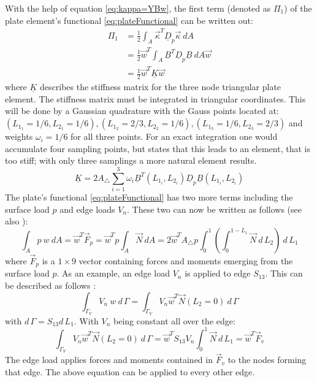   With the help of equation \ref{eq:kappa=YBw}, the first term (denoted as $\Pi_1$) of the plate element's functional \ref{eq:plateFunctional} can be written out:
  \begin{align}\label{eq:t3_pi1=0.5wTKw}
  \Pi_1 &= \frac{1}{2} \int_A \vec{\kappa}^T \underline{D}_p \vec{\kappa}\ d\!A \nonumber\\
        &= \frac{1}{2} \vec{w}^T \int_A \underline{B}^T \underline{D}_p \underline{B}\ d\!A \vec{w} \nonumber\\
        &= \frac{1}{2} \vec{w}^T \underline{K} \vec{w}
  \end{align}
  where $\underline{K}$ describes the stiffness matrix for the three node triangular plate element. The stiffness matrix must be integrated in triangular coordinates. This will be done by a Gaussian quadrature with the Gauss points located at: $(L_{1_1} = 1/6, L_{2_1} = 1/6), (L_{1_2} = 2/3, L_{2_2} = 1/6), (L_{1_3} = 1/6, L_{2_3} = 2/3)$ and weights $\omega_i = 1/6$ for all three points. For an exact integration one would accumulate four sampling points, but \cite{steinke2005finite} states that this leads to an element, that is too stiff; with only three samplings a more natural element results.
  \begin{equation}
  \underline{K} = 2 A_\triangle \sum_{i=1}^{3} \omega_i \underline{B}^T(L_{1_i}, L_{2_i}) \underline{D}_p \underline{B}(L_{1_i}, L_{2_i})
  \end{equation}
  The plate's functional \ref{eq:plateFunctional} has two more terms including the surface load $p$ and edge loads $V_n$. These two can now be written as follows (see also \cite{steinke2005finite}):
  \begin{equation}
  \int_A p\ w\ d\!A = \vec{w}^T \vec{F}_p = \vec{w}^T p \int_A \vec{N}\ d\!A = 2 \vec{w}^T A_\triangle p \int_{0}^{1}\left(\int_{0}^{1-L_1} \vec{N}\ d\,\!L_2\right)\ d\,\!L_1
  \end{equation}
  where $\vec{F}_p$ is a $1\!\times\!9$ vector containing forces and moments emerging from the surface load $p$.
  As an example, an edge load $V_n$ is applied to edge $S_{13}$. This can be described as follows \cite{steinke2005finite}:
  \begin{equation}
  \int_{\Gamma_V} V_n\:w\ d\,\!\Gamma = \int_{\Gamma_V} V_n \vec{w}^T \vec{N}(L_2 = 0)\ d\,\!\Gamma
  \end{equation}
  with $d\,\!\Gamma = S_{13} d\,\!L_1$. With $V_n$ being constant all over the edge:
  \begin{equation}
  \int_{\Gamma_V} V_n \vec{w}^T \vec{N}(L_2 = 0)\ d\,\!\Gamma = \vec{w}^T S_{13} V_n \int_{0}^{1} \vec{N}\ d\,\!L_1 = \vec{w}^T \vec{F}_v
  \end{equation}
  The edge load applies forces and moments contained in $\vec{F}_v$ to the nodes forming that edge. The above equation can be applied to every other edge.
  
